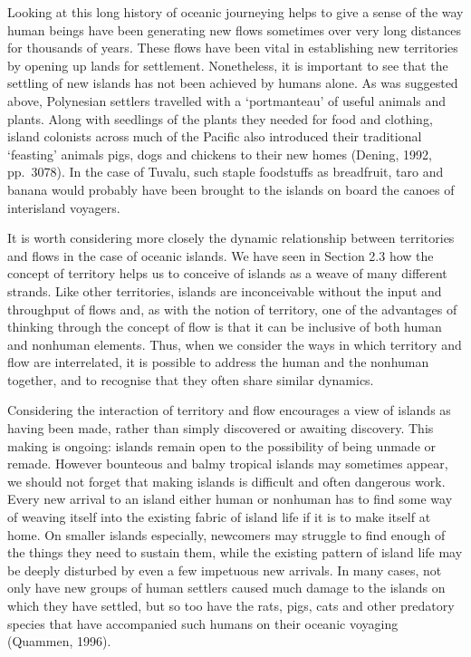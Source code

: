 \documentclass[letterpaper,10pt,english]{sphinxmanual}
\begin{document}
Looking at this long history of oceanic journeying helps to give a sense of the way human beings have been generating new flows \textendash{} sometimes over very long distances \textendash{} for thousands of years. These flows have been vital in establishing new territories by opening up lands for settlement. Nonetheless, it is important to see that the settling of new islands has not been achieved by humans alone. As was suggested above, Polynesian settlers travelled with a ‘portmanteau’ of useful animals and plants.
Along with seedlings of the plants they needed for food and clothing, island colonists across much of the Pacific also introduced their traditional ‘feasting’ animals \textendash{} pigs, dogs and chickens \textendash{} to their new homes (Dening, 1992, pp. 307\textendash{}8). In the case of Tuvalu, such staple foodstuffs as breadfruit, taro and banana would probably have been brought to the islands on board the canoes of inter\sphinxhyphen{}island voyagers.

It is worth considering more closely the dynamic relationship between territories and flows in the case of oceanic islands. We have seen in Section 2.3 how the concept of territory helps us to conceive of islands as a weave of many different strands. Like other territories, islands are inconceivable without the input and throughput of flows and, as with the notion of territory, one of the advantages of thinking through the concept of flow is that it can be inclusive of both human and non\sphinxhyphen{}human
elements. Thus, when we consider the ways in which territory and flow are interrelated, it is possible to address the human and the non\sphinxhyphen{}human together, and to recognise that they often share similar dynamics.

Considering the interaction of territory and flow encourages a view of islands as having been made, rather than simply discovered or awaiting discovery. This making is ongoing: islands remain open to the possibility of being unmade or remade. However bounteous and balmy tropical islands may sometimes appear, we should not forget that making islands is difficult and often dangerous work. Every new arrival to an island \textendash{} either human or non\sphinxhyphen{}human \textendash{} has to find some way of weaving itself into the
existing fabric of island life if it is to make itself at home. On smaller islands especially, newcomers may struggle to find enough of the things they need to sustain them, while the existing pattern of island life may be deeply disturbed by even a few impetuous new arrivals. In many cases, not only have new groups of human settlers caused much damage to the islands on which they have settled, but so too have the rats, pigs, cats and other predatory species that have accompanied such humans on
their oceanic voyaging (Quammen, 1996).
\end{document}
